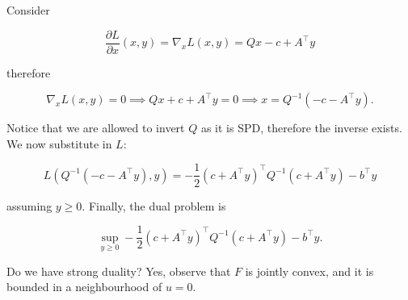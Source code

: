 \begin{example}
    Consider 

    \[ \frac{\partial L}{\partial x} (x,y) = \nabla_x L(x,y) = Qx - c + A^\top y \]

    therefore 

    \[ \nabla_x L(x,y) = 0 \implies Qx + c + A^\top y = 0 \implies x = Q^{-1}(-c - A^\top y). \]

    Notice that we are allowed to invert $Q$ as it is SPD, therefore the inverse exists. We now substitute in $L$:

    \[ L(Q^{-1}(-c - A^\top y),y) = -\frac12 \left(c + A^\top y\right)^\top Q^{-1}\left(c + A^\top y\right) - b^\top y \]

    assuming $y \ge 0$. Finally, the dual problem is 

    \[ \sup_{y \ge 0} -\frac12 \left(c + A^\top y\right)^\top Q^{-1}\left(c + A^\top y\right) - b^\top y. \]

    Do we have strong duality? Yes, observe that $F$ is jointly convex, and it is bounded in a neighbourhood of $u = 0$.
    
\end{example}

